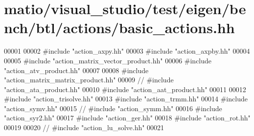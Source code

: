 \hypertarget{matio_2visual__studio_2test_2eigen_2bench_2btl_2actions_2basic__actions_8hh_source}{}\section{matio/visual\+\_\+studio/test/eigen/bench/btl/actions/basic\+\_\+actions.hh}
\label{matio_2visual__studio_2test_2eigen_2bench_2btl_2actions_2basic__actions_8hh_source}

\begin{DoxyCode}
00001 
00002 \textcolor{preprocessor}{#include "action\_axpy.hh"}
00003 \textcolor{preprocessor}{#include "action\_axpby.hh"}
00004 
00005 \textcolor{preprocessor}{#include "action\_matrix\_vector\_product.hh"}
00006 \textcolor{preprocessor}{#include "action\_atv\_product.hh"}
00007 
00008 \textcolor{preprocessor}{#include "action\_matrix\_matrix\_product.hh"}
00009 \textcolor{comment}{// #include "action\_ata\_product.hh"}
00010 \textcolor{preprocessor}{#include "action\_aat\_product.hh"}
00011 
00012 \textcolor{preprocessor}{#include "action\_trisolve.hh"}
00013 \textcolor{preprocessor}{#include "action\_trmm.hh"}
00014 \textcolor{preprocessor}{#include "action\_symv.hh"}
00015 \textcolor{comment}{// #include "action\_symm.hh"}
00016 \textcolor{preprocessor}{#include "action\_syr2.hh"}
00017 \textcolor{preprocessor}{#include "action\_ger.hh"}
00018 \textcolor{preprocessor}{#include "action\_rot.hh"}
00019 
00020 \textcolor{comment}{// #include "action\_lu\_solve.hh"}
00021 
\end{DoxyCode}
